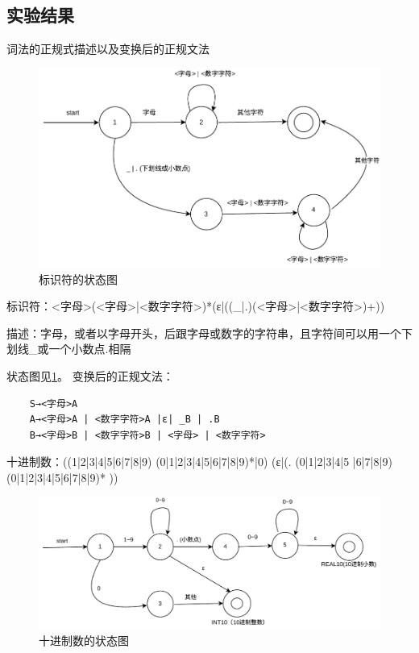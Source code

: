 \documentclass{ctexrep}
\begin{document}
\subsection{实验结果}

\begin{outline}
    \1 词法的正规式描述以及变换后的正规文法

    \begin{figure}[htp]
        \centering
        \includegraphics[width=0.8\linewidth]{2.1.drawio.pdf}
        \caption{标识符的状态图}
        \label{fig:2.1.drawio}
    \end{figure}

        \2 标识符：<字母>(<字母>|<数字字符>)*(ε|((\_|.)(<字母>|<数字字符>)+))

        描述：字母，或者以字母开头，后跟字母或数字的字符串，且字符间可以用一个下划线\_或一个小数点.相隔

        状态图见\cref{fig:2.1.drawio}。 变换后的正规文法：

        \begin{verbatim}
    S→<字母>A
    A→<字母>A | <数字字符>A |ε| _B | .B
    B→<字母>B | <数字字符>B | <字母> | <数字字符>   
        \end{verbatim}

        \2 十进制数：((1|2|3|4|5|6|7|8|9) (0|1|2|3|4|5|6|7|8|9)*|0) (ε|(. (0|1|2|3|4|5 |6|7|8|9) (0|1|2|3|4|5|6|7|8|9)* ))

        \begin{figure}[htp]
            \centering
            \includegraphics[width=0.8\linewidth]{2.2.drawio.pdf}
            \caption{十进制数的状态图}
            \label{fig:2.2.drawio}
        \end{figure}


\end{outline}
\end{document}
